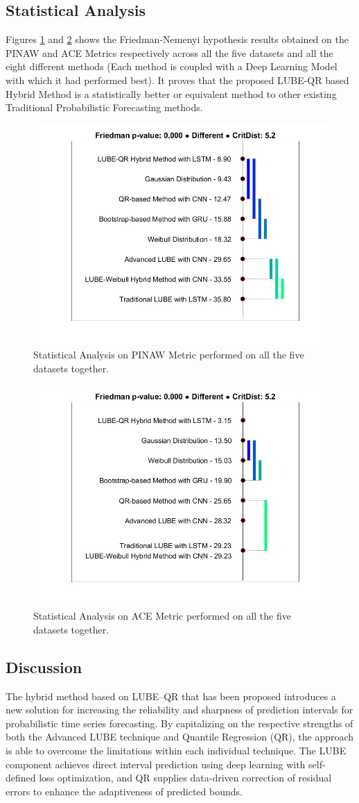 \subsection{Statistical Analysis}
Figures \ref{fig 4.6} and \ref{fig 4.7} shows the Friedman-Nemenyi hypothesis results obtained on the PINAW and ACE Metrics respectively across all the five datasets and all the eight different methods (Each method is coupled with a Deep Learning Model with which it had performed best). It proves that the proposed LUBE-QR based Hybrid Method is a statistically better or equivalent method to other existing Traditional Probabilistic Forecasting methods.
\begin{figure}
    \centering
    \includegraphics[width=0.6\linewidth]{Chap03/figs/Statistical_Analysis_All_Methods_PINAW.jpg}
    \caption{Statistical Analysis on PINAW Metric performed on all the five datasets together.}
    \label{fig 4.6}
\end{figure}
\clearpage
\begin{figure}
    \centering
    \includegraphics[width=0.6\linewidth]{Chap03/figs/Statistical_Analysis_All_Methods_ACE.jpg}
    \caption{Statistical Analysis on ACE Metric performed on all the five datasets together.}
    \label{fig 4.7}
\end{figure}

\subsection{Discussion}
The hybrid method based on LUBE–QR that has been proposed introduces a new solution for increasing the reliability and sharpness of prediction intervals for probabilistic time series forecasting. By capitalizing on the respective strengths of both the Advanced LUBE technique and Quantile Regression (QR), the approach is able to overcome the limitations within each individual technique. The LUBE component achieves direct interval prediction using deep learning with self-defined loss optimization, and QR supplies data-driven correction of residual errors to enhance the adaptiveness of predicted bounds.

